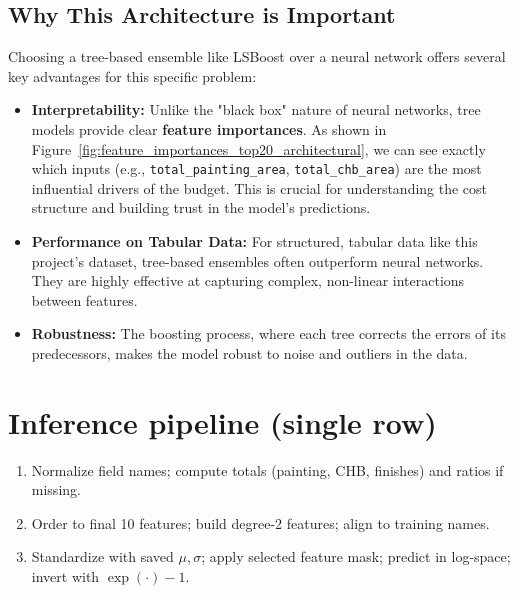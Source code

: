 \documentclass[11pt]{article}
\begin{document}
\subsection*{Why This Architecture is Important}
Choosing a tree-based ensemble like LSBoost over a neural network offers several key advantages for this specific problem:
\begin{itemize}
    \item \textbf{Interpretability:} Unlike the "black box" nature of neural networks, tree models provide clear \textbf{feature importances}. As shown in Figure~\ref{fig:feature_importances_top20_architectural}, we can see exactly which inputs (e.g., \verb|total_painting_area|, \verb|total_chb_area|) are the most influential drivers of the budget. This is crucial for understanding the cost structure and building trust in the model's predictions.
    \item \textbf{Performance on Tabular Data:} For structured, tabular data like this project's dataset, tree-based ensembles often outperform neural networks. They are highly effective at capturing complex, non-linear interactions between features.
    \item \textbf{Robustness:} The boosting process, where each tree corrects the errors of its predecessors, makes the model robust to noise and outliers in the data.
\end{itemize}

\section*{Inference pipeline (single row)}
\begin{enumerate}
  \item Normalize field names; compute totals (painting, CHB, finishes) and ratios if missing.
  \item Order to final 10 features; build degree-2 features; align to training names.
  \item Standardize with saved $\mu,\sigma$; apply selected feature mask; predict in log-space; invert with $\exp(\cdot)-1$.
\end{enumerate}
\end{document}
